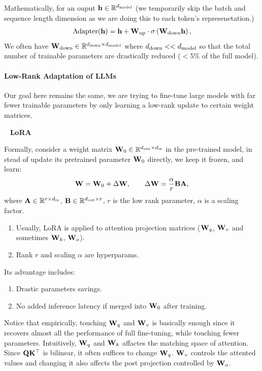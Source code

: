\documentclass[11pt]{article}  %
\begin{document}
Mathematically, for an ouput $\mathbf{h} \in \mathbb{R}^{d_{\text{model}}}$ (we temporarily skip the batch and sequence length dimension as we are doing this to each token's represenetation.)
\begin{align*}
  \text{Adapter}(\mathbf{h}) = \mathbf{h} + \mathbf{W}_{\text{up}} \cdot \sigma\left( \mathbf{W}_{\text{down}}\mathbf{h} \right), 
\end{align*}
We often have $\mathbf{W}_{\text{down}} \in \mathbb{R}^{d_{\text{down}} \times d_{\text{model}}}$ where $d_{\text{down}} << d_{\text{model}}$ so that the total number of trainable parameters are drastically reduced ($<5\%$ of the full model).


\paragraph{Low-Rank Adaptation of LLMs} Our goal here remains the same, we are trying to fine-tune large models with far fewer trainable parameters by only learning a low-rank update to certain weight matrices.

\textbullet~ \textbf{LoRA}

Formally, consider a weight matrix $\mathbf{W}_0 \in \mathbb{R}^{d_{\text{out}} \times d_{\text{in}}}$ in the pre-trained model, in stead of update its pretrained parameter $\mathbf{W}_0$ directly, we keep it frozen, and learn: 
\begin{align*}
  \mathbf{W} = \mathbf{W}_0 + \Delta \mathbf{W}, \qquad \Delta \mathbf{W} = \frac{\alpha}{r}\mathbf{B}\mathbf{A},
\end{align*}
where $\mathbf{A} \in \mathbb{R}^{r \times d_{\text{in}}}$, $\mathbf{B} \in \mathbb{R}^{d_{\text{out}} \times r}$, $r$ is the low rank parameter, $\alpha$ is a scaling factor.

\begin{enumerate}
  \item Usually, LoRA is applied to attention projection matrices ($\mathbf{W}_q$, $\mathbf{W}_v$ and sometimes $\mathbf{W}_k$, $\mathbf{W}_o$).
  \item Rank $r$ and scaling $\alpha$ are hyperparams.
\end{enumerate}


Its advantage includes: 
\begin{enumerate}
  \item Drastic parameters savings.
  \item No added inference latency if merged into $\mathbf{W}_0$ after training.
\end{enumerate}

Notice that empirically, touching $\mathbf{W}_q$ and $\mathbf{W}_v$ is basically enough since it recovers almost all the performance of full fine-tuning, while touching fewer parameters.
Intuitively, $\mathbf{W}_q$ and $\mathbf{W}_k$ affactes the matching space of attention.
Since $\mathbf{Q}\mathbf{K}^{\top}$ is bilinear, it often suffices to change $\mathbf{W}_q$.  
$\mathbf{W}_v$ controls the attented values and changing it also affects the post projection controlled by $\mathbf{W}_o$.
\end{document}
